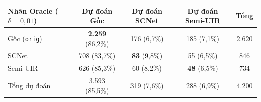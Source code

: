 \documentclass[runningheads]{llncs}
\begin{document}
\begin{table}[t]
{\begin{tabular}{l c c c c}
            Nhãn Oracle ($\delta = 0{,}01$)& Dự đoán Gốc               & Dự đoán SCNet       & Dự đoán Semi-UIR                    & Tổng     \\
            \midrule
            Gốc (\texttt{orig})            & \textbf{2.259} (86,2\%)   & 176 (6,7\%)         & 185 (7,1\%)                         & 2.620    \\
            SCNet                          & 708 (83,7\%)              & \textbf{83} (9,8\%) & 55 (6,5\%)                          & 846      \\
            Semi-UIR                       & 626 (85,3\%)              & 60 (8,2\%)          & \textbf{48} (6,5\%)                 & 734      \\
            \midrule
            Tổng dự đoán                   & 3.593 (85,5\%)            & 319 (7,6\%)         & 288 (6,9\%)                         & 4.200    \\
            \bottomrule
        \end{tabular}
    }
\end{table}
\end{document}
